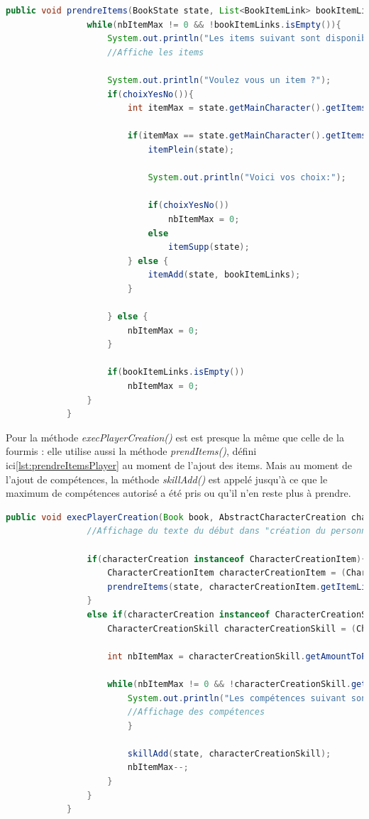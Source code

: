 		\begin{lstlisting}[gobble=12, language=java, label=lst:prendreItemsPlayer, caption=prendreItems() du Player]
			public void prendreItems(BookState state, List<BookItemLink> bookItemLinks, int nbItemMax){
				while(nbItemMax != 0 && !bookItemLinks.isEmpty()){
					System.out.println("Les items suivant sont disponible:");
					//Affiche les items

					System.out.println("Voulez vous un item ?");
					if(choixYesNo()){
						int itemMax = state.getMainCharacter().getItemsMax();

						if(itemMax == state.getMainCharacter().getItems().size()){
							itemPlein(state);

							System.out.println("Voici vos choix:");

							if(choixYesNo())
								nbItemMax = 0;
							else
								itemSupp(state);
						} else {
							itemAdd(state, bookItemLinks);
						}

					} else {
						nbItemMax = 0;
					}

					if(bookItemLinks.isEmpty())
						nbItemMax = 0;
				}
			}

		\end{lstlisting}

		Pour la méthode \textit{execPlayerCreation()} est est presque la même que celle de la fourmis : elle utilise aussi la méthode \textit{prendItems()}, défini ici\ref{lst:prendreItemsPlayer} au moment de l'ajout des items. Mais au moment de l'ajout de compétences, la méthode \textit{skillAdd()} est appelé jusqu'à ce que le maximum de compétences autorisé a été pris ou qu'il n'en reste plus à prendre.\\

		\begin{lstlisting}[gobble=12, language=java, caption=execPlayerCreation() du Player]
			public void execPlayerCreation(Book book, AbstractCharacterCreation characterCreation, BookState state){
				//Affichage du texte du début dans "création du personnage"

				if(characterCreation instanceof CharacterCreationItem){
					CharacterCreationItem characterCreationItem = (CharacterCreationItem) characterCreation;
					prendreItems(state, characterCreationItem.getItemLinks(), characterCreationItem.getAmountToPick());
				}
				else if(characterCreation instanceof CharacterCreationSkill){
					CharacterCreationSkill characterCreationSkill = (CharacterCreationSkill) characterCreation;

					int nbItemMax = characterCreationSkill.getAmountToPick();

					while(nbItemMax != 0 && !characterCreationSkill.getSkillLinks().isEmpty()){
						System.out.println("Les compétences suivant sont disponible:");
						//Affichage des compétences
						}

						skillAdd(state, characterCreationSkill);
						nbItemMax--;
					}
				}
			}
			\end{lstlisting}


